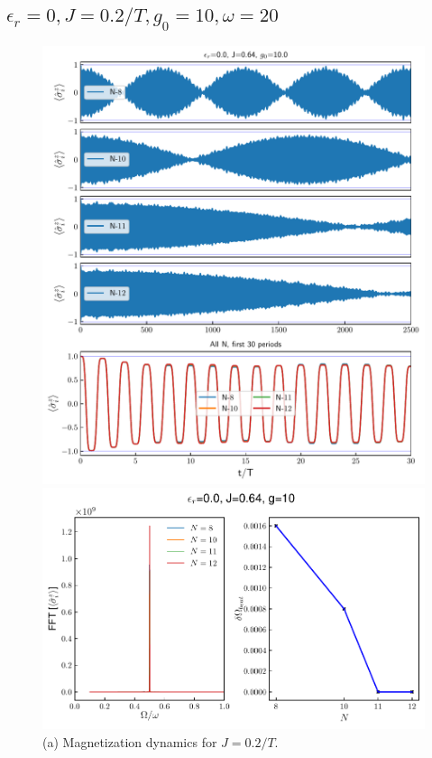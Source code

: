 \documentclass[a4paper, 11pt]{article}
\begin{document}
\subsection{$\epsilon_r = 0, J = 0.2/T, g_0 = 10, \omega = 20$}
\begin{figure}[h!]
    \centering
    \begin{minipage}[t]{0.48\textwidth}
        \centering
        \includegraphics[width=\textwidth]{figs/time_mag_epsilon_r0.00_J0.64_g10.0_allN.pdf}
        \caption*{(a) Magnetization dynamics for $J = 0.2/T$.}
    \end{minipage}
    \hfill
    \begin{minipage}[t]{0.48\textwidth}
        \centering
        \includegraphics[width=\textwidth]{figs/DTC_mag_fft_beat_er=0.0_J=0.6366197723675814_g=10.0.pdf}

\end{minipage}
\end{figure}
\end{document}
